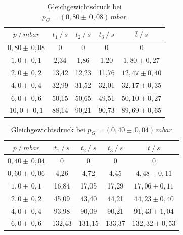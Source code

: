 \begin{table}[H]
\centering
\label{tab:leck_Dreh2}
\begin{tabular}{c|c|c|c|c}
	{$p \:/\: \si{mbar}$} & {$t_1 \:/\: \si{s} $} & {$t_2 \:/\: \si{s} $} & {$t_3 \:/\: \si{s} $} & {$\bar{t} \:/\: \si{s}$}\\
\midrule
$0,80 \pm \, 0,08$ &0 &0 &0 &0\\
$1,0 \pm \, 0,1$ &   2,34 &  1,86 &  1,20 & $1,80 \pm 0,27$\\
$2,0 \pm \, 0,2$ &   13,42  &  12,23 &  11,76 & $12,47 \pm 0,40 $\\
$4,0 \pm \, 0,4$ &   32,99 &  31,52 &  32,01 & $32,17 \pm 0,35 $\\
$6,0 \pm \, 0,6$  &   50,15 &  50,65 &  49,51 & $50,10 \pm 0,27 $\\
$10,0 \pm \, 0,1$ &   88,14 &  90,21 &  90,73 & $89,69 \pm 0,65 $\\
\end{tabular}
\caption{Gleichgewichtsdruck bei $p_G=(0,80 \pm \, 0,08) \, \si{mbar}$}
\end{table}

\begin{table}[H]
\centering
\label{tab:leck_Dreh3}
\begin{tabular}{c|c|c|c|c}
	{$p \:/\: \si{mbar}$} & {$t_1 \:/\: \si{s} $} & {$t_2 \:/\: \si{s} $} & {$t_3 \:/\: \si{s} $} & {$\bar{t} \:/\: \si{s}$}\\
\midrule
$0,40 \pm \, 0,04$ &0 &0 &0 &0\\
$0,60 \pm \, 0,06$ &   4,26 &  4,72 &  4,45 & $4,48 \pm 0,11$\\
$1,0 \pm \, 0,1$ &   16,84  &  17,05 &  17,29 & $17,06 \pm 0,11 $\\
$2,0 \pm \, 0,2$ &   45,09 &  43,40 &  44,21 & $44,23 \pm 0,40 $\\
$4,0 \pm \, 0,4$ &   93,98 &  90,09 & 90,21 & $91,43 \pm 1,04 $\\
$6,0 \pm \, 0,6$ &   132,43 &  131,15 &  133,37 & $132,32 \pm 0,53 $\\
\end{tabular}
\caption{Gleichgewichtsdruck bei $p_G=(0,40 \pm \, 0,04) \, \si{mbar}$}
\end{table}

